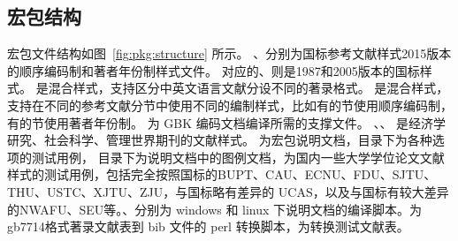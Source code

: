 \documentclass[11pt]{article} %
\begin{document}
\subsection{宏包结构}

宏包文件结构如图~\ref{fig:pkg:structure} 所示。
、分别为国标参考文献样式2015版本的顺序编码制和著者年份制样式文件。
对应的、则是1987和2005版本的国标样式。
是混合样式，支持区分中英文语言文献分设不同的著录格式。
是混合样式，支持在不同的参考文献分节中使用不同的编制样式，比如有的节使用顺序编码制，有的节使用著者年份制。
为 GBK 编码文档编译所需的支撑文件。
、、 是经济学研究、社会科学、管理世界期刊的文献样式。%
 为宏包说明文档，目录下为各种选项的测试用例，
目录下为说明文档中的图例文档，为国内一些大学学位论文文献样式的测试用例，包括完全按照国标的BUPT、CAU、ECNU、FDU、SJTU、THU、USTC、XJTU、ZJU，与国标略有差异的 UCAS，以及与国标有较大差异的NWAFU、SEU等。、分别为 windows 和 linux 下说明文档的编译脚本。为gb7714格式著录文献表到 bib 文件的 perl 转换脚本，为转换测试文献表。
\end{document}
